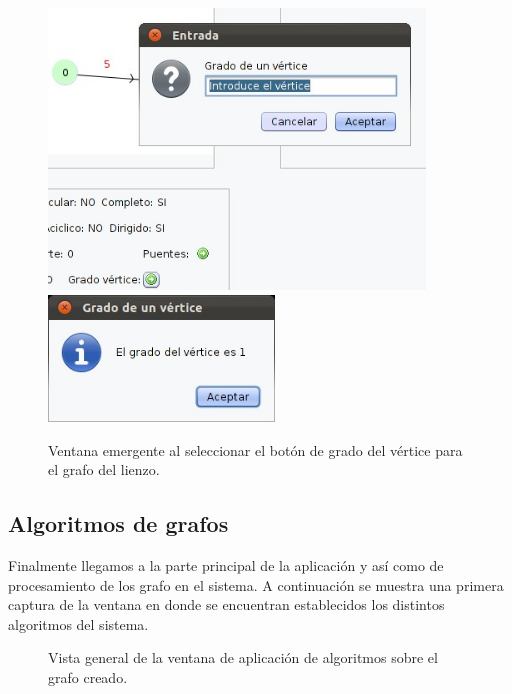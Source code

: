 \begin{figure}[H]
\begin{center}
\includegraphics[width=10cm]{./imagenes_documentacion/imagen_grado_vertice_grafo.jpeg}
\includegraphics[width=6cm]{./imagenes_documentacion/imagen_grado_grafo_ventana.jpeg}
\caption{Ventana emergente al seleccionar el botón de grado del vértice para el grafo del lienzo.}
\end{center}
\end{figure}

\newpage
\subsection{Algoritmos de grafos}

Finalmente llegamos a la parte principal de la aplicación y así como de procesamiento de los grafo en el sistema. A continuación se muestra una primera captura de la ventana en donde se encuentran establecidos los distintos algoritmos del sistema. 

\begin{figure}[H]
\begin{center}
\caption{Vista general de la ventana de aplicación de algoritmos sobre el grafo creado.}
\end{center}
\end{figure}

